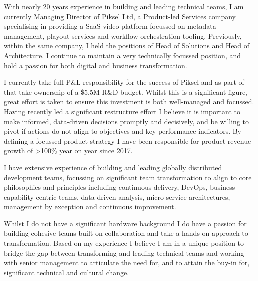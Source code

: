 \documentclass[11pt, a4paper]{awesome-cv} %
\begin{document}
\makecvheader %

\makelettertitle %


\begin{cvletter}



With nearly 20 years experience in building and leading technical teams, I am currently Managing Director of Piksel Ltd, a Product-led Services company specialising in providing a SaaS video platform focussed on metadata management, playout services and workflow orchestration tooling. Previously, within the same company, I held the positions of Head of Solutions and Head of Architecture. I continue to maintain a very technically focussed position, and hold a passion for both digital and business transformation.



I currently take full P\&L responsibility for the success of Piksel and as part of that take ownership of a \$5.5M R\&D budget. Whilst this is a significant figure, great effort is taken to ensure this investment is both well-managed and focussed. Having recently led a significant restructure effort I believe it is important to make informed, data-driven decisions promptly and decisively, and be willing to pivot if actions do not align to objectives and key performance indicators. By defining a focussed product strategy I have been responsible for product revenue growth of >100\% year on year since 2017.

\vspace{3.4mm}

I have extensive experience of building and leading globally distributed development teams, focussing on significant team transformation to align to core philosophies and principles including continuous delivery, DevOps, business capability centric teams, data-driven analysis, micro-service architectures, management by exception and continuous improvement.

\vspace{3.4mm}

Whilst I do not have a significant hardware background I do have a passion for building cohesive teams built on collaboration and take a hands-on approach to transformation. Based on my experience I believe I am in a unique position to bridge the gap between transforming and leading technical teams and working with senior management to articulate the need for, and to attain the buy-in for, significant technical and cultural change.

\vspace{3.4mm}


\end{cvletter}


\makeletterclosing %
\end{document}
